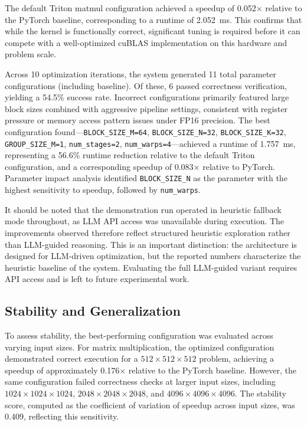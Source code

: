 \documentclass{article}
\begin{document}
The default Triton matmul configuration achieved a speedup of 0.052$\times$ relative to the PyTorch baseline, corresponding to a runtime of 2.052~ms. This confirms that while the kernel is functionally correct, significant tuning is required before it can compete with a well-optimized cuBLAS implementation on this hardware and problem scale.

Across 10 optimization iterations, the system generated 11 total parameter configurations (including baseline). Of these, 6 passed correctness verification, yielding a 54.5\% success rate. Incorrect configurations primarily featured large block sizes combined with aggressive pipeline settings, consistent with register pressure or memory access pattern issues under FP16 precision. The best configuration found—\texttt{BLOCK\_SIZE\_M=64}, \texttt{BLOCK\_SIZE\_N=32}, \texttt{BLOCK\_SIZE\_K=32}, \texttt{GROUP\_SIZE\_M=1}, \texttt{num\_stages=2}, \texttt{num\_warps=4}—achieved a runtime of 1.757~ms, representing a 56.6\% runtime reduction relative to the default Triton configuration, and a corresponding speedup of 0.083$\times$ relative to PyTorch. Parameter impact analysis identified \texttt{BLOCK\_SIZE\_N} as the parameter with the highest sensitivity to speedup, followed by \texttt{num\_warps}.

It should be noted that the demonstration run operated in heuristic fallback mode throughout, as LLM API access was unavailable during execution. The improvements observed therefore reflect structured heuristic exploration rather than LLM-guided reasoning. This is an important distinction: the architecture is designed for LLM-driven optimization, but the reported numbers characterize the heuristic baseline of the system. Evaluating the full LLM-guided variant requires API access and is left to future experimental work.

\subsection{Stability and Generalization}

To assess stability, the best-performing configuration was evaluated across varying input sizes. For matrix multiplication, the optimized configuration demonstrated correct execution for a $512 \times 512 \times 512$ problem, achieving a speedup of approximately 0.176$\times$ relative to the PyTorch baseline. However, the same configuration failed correctness checks at larger input sizes, including $1024 \times 1024 \times 1024$, $2048 \times 2048 \times 2048$, and $4096 \times 4096 \times 4096$. The stability score, computed as the coefficient of variation of speedup across input sizes, was 0.409, reflecting this sensitivity.
\end{document}
